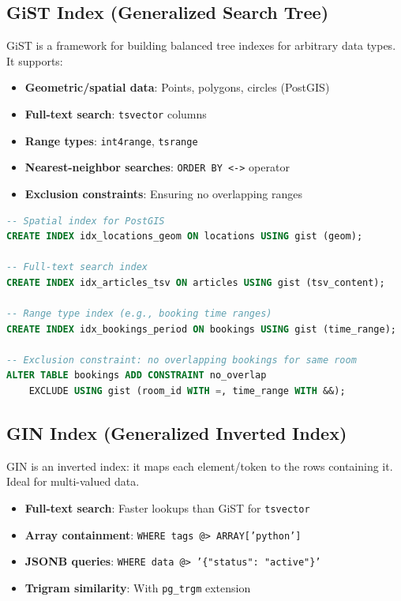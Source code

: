 \documentclass[12pt,a4paper]{article}
\begin{document}
\subsection{GiST Index (Generalized Search Tree)}

GiST is a framework for building balanced tree indexes for arbitrary data types. It supports:

\begin{itemize}
    \item \textbf{Geometric/spatial data}: Points, polygons, circles (PostGIS)
    \item \textbf{Full-text search}: \texttt{tsvector} columns
    \item \textbf{Range types}: \texttt{int4range}, \texttt{tsrange}
    \item \textbf{Nearest-neighbor searches}: \texttt{ORDER BY <->} operator
    \item \textbf{Exclusion constraints}: Ensuring no overlapping ranges
\end{itemize}

\begin{lstlisting}[language=SQL, caption={GiST index examples}]
-- Spatial index for PostGIS
CREATE INDEX idx_locations_geom ON locations USING gist (geom);

-- Full-text search index
CREATE INDEX idx_articles_tsv ON articles USING gist (tsv_content);

-- Range type index (e.g., booking time ranges)
CREATE INDEX idx_bookings_period ON bookings USING gist (time_range);

-- Exclusion constraint: no overlapping bookings for same room
ALTER TABLE bookings ADD CONSTRAINT no_overlap
    EXCLUDE USING gist (room_id WITH =, time_range WITH &&);
\end{lstlisting}

\subsection{GIN Index (Generalized Inverted Index)}

GIN is an inverted index: it maps each element/token to the rows containing it. Ideal for multi-valued data.

\begin{itemize}
    \item \textbf{Full-text search}: Faster lookups than GiST for \texttt{tsvector}
    \item \textbf{Array containment}: \texttt{WHERE tags @> ARRAY['python']}
    \item \textbf{JSONB queries}: \texttt{WHERE data @> '\{"status": "active"\}'}
    \item \textbf{Trigram similarity}: With \texttt{pg\_trgm} extension
\end{itemize}
\end{document}
